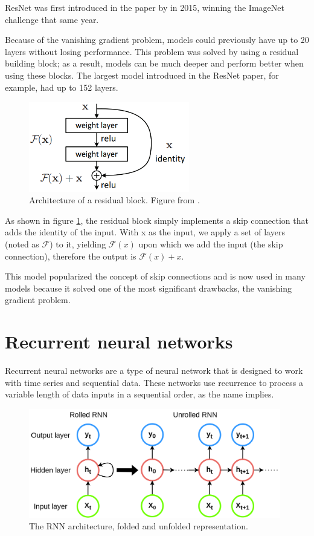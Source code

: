 \documentclass{report}[12pt, a4paper]
\begin{document}
ResNet was first introduced in the paper  \cite{resnet_paper} by \citeauthor{resnet_paper} in 2015, winning the ImageNet challenge that same year.

Because of the vanishing gradient problem, models could previously have up to 20 layers without losing performance. This problem was solved by using a residual building block; as a result, models can be much deeper and perform better when using these blocks. The largest model introduced in the ResNet paper, for example, had up to 152 layers.

\begin{figure}[htp]
    \centering
    \includegraphics[width=7cm]{residual_block}
    \caption{Architecture of a residual block. Figure from \cite{resnet_paper}.}
    \label{fig:residual_block}
\end{figure}

As shown in figure \ref{fig:residual_block}, the residual block simply implements a skip connection that adds the identity of the input. With x as the input, we apply a set of layers (noted as $\mathcal{F}$) to it, yielding $\mathcal{F}(x)$ upon which we add the input (the skip connection), therefore the output is $\mathcal{F}(x) + x$.

This model popularized the concept of skip connections and is now used in many models because it solved one of the most significant drawbacks, the vanishing gradient problem.

\section{Recurrent neural networks}

Recurrent neural networks are a type of neural network that is designed to work with time series and sequential data. These networks use recurrence to process a variable length of data inputs in a sequential order, as the name implies.

\begin{figure}[htp]
    \centering
    \includegraphics[width=11cm]{rnn_diagram}
    \caption{The RNN architecture, folded and unfolded representation.}
    \label{fig:rnn_diagram}
\end{figure}
\end{document}
